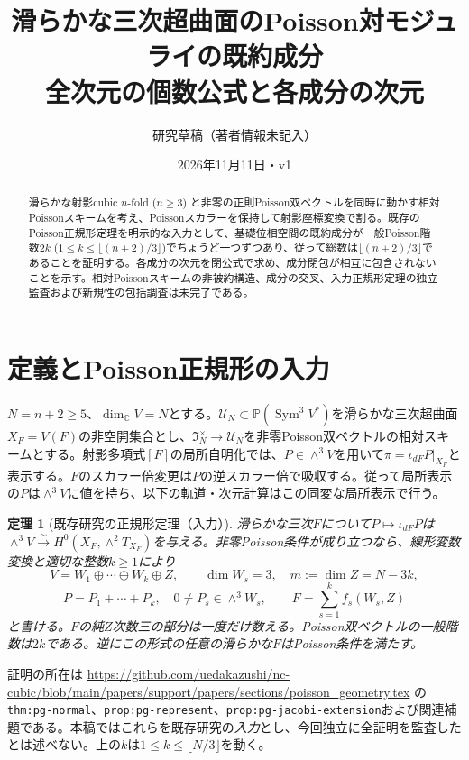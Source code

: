 \documentclass[11pt,a4paper]{ltjsarticle}
\title{滑らかな三次超曲面のPoisson対モジュライの既約成分\\
\large 全次元の個数公式と各成分の次元}
\author{研究草稿（著者情報未記入）}
\date{2026年11月11日・v1}
\newtheorem{theorem}{定理}[section]
\newcommand{\C}{\mathbb C}
\newcommand{\PP}{\mathbb P}
\newcommand{\Sym}{\operatorname{Sym}}
\begin{document}
\maketitle
\begin{abstract}
滑らかな射影cubic $n$-fold ($n\ge3$) と非零の正則Poisson双ベクトルを同時に動かす相対Poissonスキームを考え、Poissonスカラーを保持して射影座標変換で割る。既存のPoisson正規形定理を明示的な入力として、基礎位相空間の既約成分が一般Poisson階数$2k$ ($1\le k\le\lfloor(n+2)/3\rfloor$)でちょうど一つずつあり、従って総数は$\lfloor(n+2)/3\rfloor$であることを証明する。各成分の次元を閉公式で求め、成分閉包が相互に包含されないことを示す。相対Poissonスキームの非被約構造、成分の交叉、入力正規形定理の独立監査および新規性の包括調査は未完了である。
\end{abstract}
\section{定義とPoisson正規形の入力}
$N=n+2\ge5$、$\dim_\C V=N$とする。$\mathcal U_N\subset\PP(\Sym^3V^*)$を滑らかな三次超曲面$X_F=V(F)$の非空開集合とし、$\mathfrak I_N^\times\to\mathcal U_N$を非零Poisson双ベクトルの相対スキームとする。射影多項式$[F]$の局所自明化では、$P\in\wedge^3V$を用いて$\pi=\iota_{dF}P|_{X_F}$と表示する。$F$のスカラー倍変更は$P$の逆スカラー倍で吸収する。従って局所表示の$P$は$\wedge^3V$に値を持ち、以下の軌道・次元計算はこの同変な局所表示で行う。

\begin{theorem}[既存研究の正規形定理（入力）]\label{thm:normal}
滑らかな三次$F$について$P\mapsto \iota_{dF}P$は$\wedge^3V\xrightarrow{\sim} H^0(X_F,\wedge^2T_{X_F})$を与える。非零Poisson条件が成り立つなら、線形変数変換と適切な整数$k\ge1$により
\[
 V=W_1\oplus\cdots\oplus W_k\oplus Z,\qquad
 \dim W_s=3,\quad m:=\dim Z=N-3k,
\]
\[
 P=P_1+\cdots+P_k,\quad
 0\ne P_s\in\wedge^3W_s,\qquad
 F=\sum_{s=1}^k f_s(W_s,Z)
\]
と書ける。$F$の純$Z$次数三の部分は一度だけ数える。Poisson双ベクトルの一般階数は$2k$である。逆にこの形式の任意の滑らかな$F$はPoisson条件を満たす。
\end{theorem}
証明の所在は
\url{https://github.com/uedakazushi/nc-cubic/blob/main/papers/support/papers/sections/poisson_geometry.tex} の\texttt{thm:pg-normal}、\texttt{prop:pg-represent}、\texttt{prop:pg-jacobi-extension}および関連補題である。本稿ではこれらを既存研究の\emph{入力}とし、今回独立に全証明を監査したとは述べない。上の$k$は$1\le k\le\lfloor N/3\rfloor$を動く。
\end{document}
